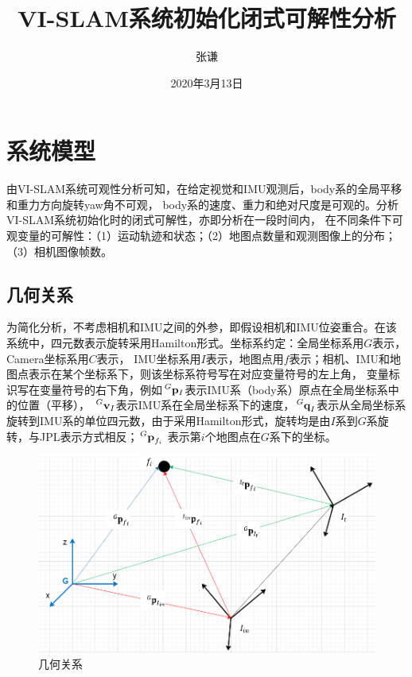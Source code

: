 \documentclass{article}
\title{VI-SLAM系统初始化闭式可解性分析}
\author{张谦}
\date{2020年3月13日}
\begin{document}
\maketitle
\tableofcontents
\newpage

\section{系统模型}
由VI-SLAM系统可观性分析可知，在给定视觉和IMU观测后，body系的全局平移和重力方向旋转yaw角不可观，
body系的速度、重力和绝对尺度是可观的。分析VI-SLAM系统初始化时的闭式可解性，亦即分析在一段时间内，
在不同条件下可观变量的可解性：（1）运动轨迹和状态；（2）地图点数量和观测图像上的分布；（3）相机图像帧数。

\subsection{几何关系}
为简化分析，不考虑相机和IMU之间的外参，即假设相机和IMU位姿重合。在该系统中，四元数表示旋转采用Hamilton形式。坐标系约定：全局坐标系用$G$表示，Camera坐标系用$C$表示，
IMU坐标系用$I$表示，地图点用$f$表示；相机、IMU和地图点表示在某个坐标系下，则该坐标系符号写在对应变量符号的左上角，
变量标识写在变量符号的右下角，例如$\sideset{^G}{}{\mathop{\mathbf{p}_{I}}}$表示IMU系（body系）原点在全局坐标系中的位置（平移），
$\sideset{^G}{}{\mathop{\textbf{v}_{I}}}$表示IMU系在全局坐标系下的速度，$\sideset{^G}{}{\mathop{\textbf{q}_{I}}}$表示从全局坐标系
旋转到IMU系的单位四元数，由于采用Hamilton形式，旋转均是由$I$系到$G$系旋转，与JPL表示方式相反；$\sideset{^G}{}{\mathop{\textbf{p}_{f_i}}}$
表示第$i$个地图点在$G$系下的坐标。
\begin{figure}[ht]
    \centering
    \includegraphics[width=15cm]{figure1.png}
    \caption{几何关系}
    \label{figs:geometryRelation}
\end{figure}
\end{document}
